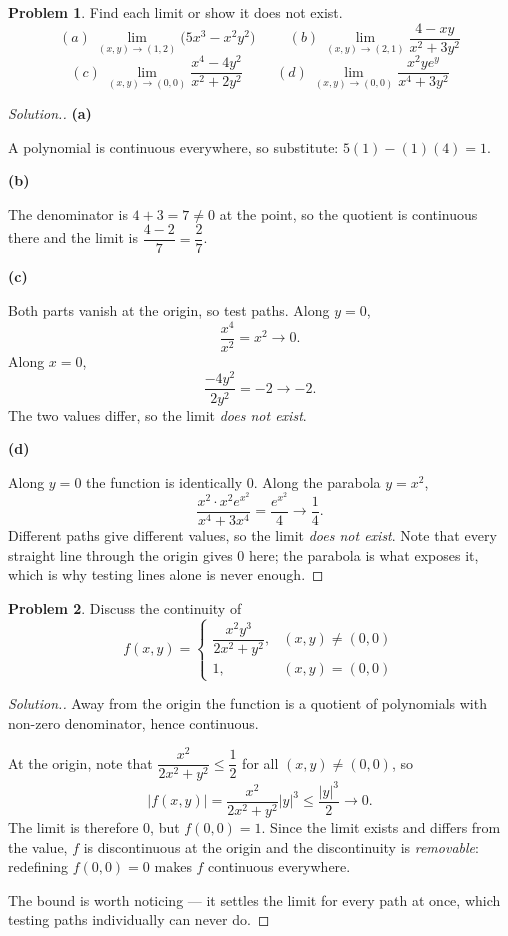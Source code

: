 \documentclass[11pt,a4paper]{article}
\theoremstyle{definition}
\newtheorem{problemx}{Problem}[subsection]
\newenvironment{problem}{\begin{problemx}}{\end{problemx}}
\newenvironment{solution}
  {\renewcommand{\qedsymbol}{}\begin{proof}[\textit{Solution}.]}
  {\end{proof}}
\newcommand{\subhead}[1]{%
  \par\medskip\noindent\textbf{#1}\par\nobreak\smallskip}
\begin{document}
\begin{problem}
Find each limit or show it does not exist.
$$(a)\ \lim_{(x,y)\rightarrow(1,2)}\big(5x^3-x^2y^2\big)\hspace{1cm}
(b)\ \lim_{(x,y)\rightarrow(2,1)}\frac{4-xy}{x^2+3y^2}$$
$$(c)\ \lim_{(x,y)\rightarrow(0,0)}\frac{x^4-4y^2}{x^2+2y^2}\hspace{1cm}
(d)\ \lim_{(x,y)\rightarrow(0,0)}\frac{x^2ye^y}{x^4+3y^2}$$
\end{problem}
\begin{solution}
\subhead{(a)}
A polynomial is continuous everywhere, so substitute:
$5(1) - (1)(4) = 1$.

\subhead{(b)}
The denominator is $4+3 = 7\neq 0$ at the point, so the quotient is continuous
there and the limit is $\dfrac{4-2}{7} = \dfrac{2}{7}$.

\subhead{(c)}
Both parts vanish at the origin, so test paths. Along $y=0$,
$$\frac{x^4}{x^2} = x^2\longrightarrow 0 .$$
Along $x=0$,
$$\frac{-4y^2}{2y^2} = -2\longrightarrow -2 .$$
The two values differ, so the limit \emph{does not exist}.

\subhead{(d)}
Along $y=0$ the function is identically $0$. Along the parabola $y = x^2$,
$$\frac{x^2\cdot x^2e^{x^2}}{x^4+3x^4} = \frac{e^{x^2}}{4}\longrightarrow\frac14 .$$
Different paths give different values, so the limit \emph{does not exist}. Note
that every straight line through the origin gives $0$ here; the parabola is what
exposes it, which is why testing lines alone is never enough.
\end{solution}

\begin{problem}
Discuss the continuity of
$$f(x,y) = \begin{cases}
\dfrac{x^2y^3}{2x^2+y^2}, & (x,y)\neq(0,0)\\[2mm]
1, & (x,y) = (0,0)
\end{cases}$$
\end{problem}
\begin{solution}
Away from the origin the function is a quotient of polynomials with non-zero
denominator, hence continuous.

At the origin, note that $\dfrac{x^2}{2x^2+y^2}\leq\dfrac12$ for all
$(x,y)\neq(0,0)$, so
$$\left|f(x,y)\right| = \frac{x^2}{2x^2+y^2}\left|y\right|^3
\leq \frac{\left|y\right|^3}{2}\longrightarrow 0 .$$
The limit is therefore $0$, but $f(0,0) = 1$. Since the limit exists and differs
from the value, $f$ is discontinuous at the origin and the discontinuity is
\emph{removable}: redefining $f(0,0) = 0$ makes $f$ continuous everywhere.

The bound is worth noticing --- it settles the limit for every path at once,
which testing paths individually can never do.
\end{solution}
\end{document}
